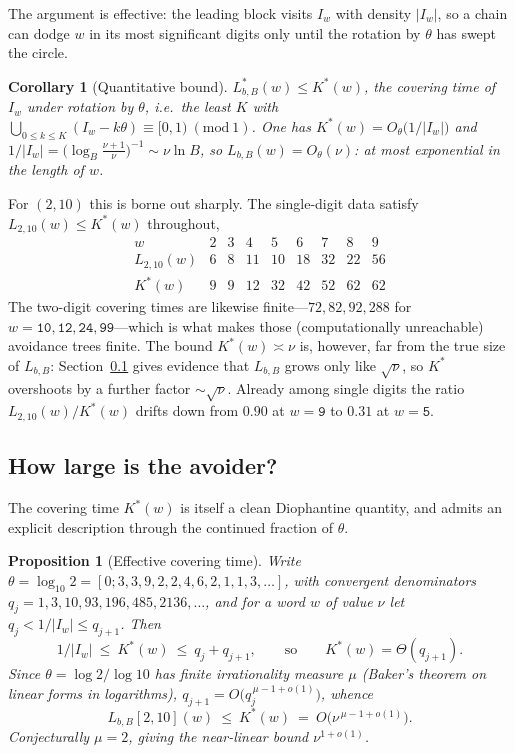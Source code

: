 \documentclass[11pt]{article}
\theoremstyle{plain}
\newtheorem{proposition}{Proposition}
\newtheorem{corollary}{Corollary}
\theoremstyle{definition}
\theoremstyle{remark}
\newcommand{\Lbb}{L_{b,B}}
\begin{document}
The argument is effective: the leading block visits $I_w$ with density $|I_w|$, so a chain can dodge $w$ in its most significant digits only until the rotation by $\theta$ has swept the circle.

\begin{corollary}[Quantitative bound]\label{cor:quant}
$L^{*}_{b,B}(w)\le K^{*}(w)$, the covering time of $I_w$ under rotation by $\theta$, i.e.\ the least $K$ with $\bigcup_{0\le k\le K}(I_w-k\theta)\equiv[0,1)\ (\mathrm{mod}\ 1)$. One has $K^{*}(w)=O_\theta\!\bigl(1/|I_w|\bigr)$ and $1/|I_w|=\bigl(\log_B\tfrac{\nu+1}{\nu}\bigr)^{-1}\sim\nu\ln B$, so $\Lbb(w)=O_\theta(\nu)$: at most exponential in the length of $w$.
\end{corollary}

For $(2,10)$ this is borne out sharply. The single-digit data satisfy $L_{2,10}(w)\le K^{*}(w)$ throughout,
\[
\begin{array}{c|cccccccc}
w & 2&3&4&5&6&7&8&9\\\hline
L_{2,10}(w) & 6&8&11&10&18&32&22&56\\[1pt]
K^{*}(w) & 9&9&12&32&42&52&62&62
\end{array}
\]
The two-digit covering times are likewise finite---$72,82,92,288$ for $w=\texttt{10},\texttt{12},\texttt{24},\texttt{99}$---which is what makes those (computationally unreachable) avoidance trees finite. The bound $K^{*}(w)\asymp\nu$ is, however, far from the true size of $\Lbb$: Section~\ref{sec:bounds} gives evidence that $\Lbb$ grows only like $\sqrt\nu$, so $K^{*}$ overshoots by a further factor $\sim\sqrt\nu$. Already among single digits the ratio $L_{2,10}(w)/K^{*}(w)$ drifts down from $0.90$ at $w=\texttt{9}$ to $0.31$ at $w=\texttt{5}$.

\subsection{How large is the avoider?}\label{sec:bounds}

The covering time $K^{*}(w)$ is itself a clean Diophantine quantity, and admits an explicit description through the continued fraction of $\theta$.

\begin{proposition}[Effective covering time]\label{prop:cover}
Write $\theta=\log_{10}2=[0;3,3,9,2,2,4,6,2,1,1,3,\dots]$, with convergent denominators $q_j=1,3,10,93,196,485,2136,\dots$, and for a word $w$ of value $\nu$ let $q_j<1/|I_w|\le q_{j+1}$. Then
\[
1/|I_w|\ \le\ K^{*}(w)\ \le\ q_j+q_{j+1},\qquad\text{so}\qquad K^{*}(w)=\Theta(q_{j+1}).
\]
Since $\theta=\log2/\log10$ has \emph{finite} irrationality measure $\mu$ (Baker's theorem on linear forms in logarithms), $q_{j+1}=O\!\bigl(q_j^{\,\mu-1+o(1)}\bigr)$, whence
\[
\Lbb[2,10](w)\ \le\ K^{*}(w)\ =\ O\!\bigl(\nu^{\,\mu-1+o(1)}\bigr).
\]
Conjecturally $\mu=2$, giving the near-linear bound $\nu^{1+o(1)}$.
\end{proposition}
\end{document}
